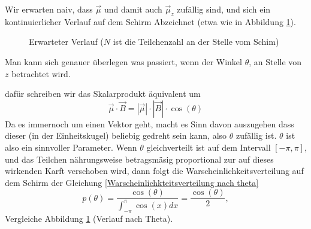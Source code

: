 \documentclass{article}
\begin{document}
Wir erwarten naiv, dass $\vec{\mu}$ und damit auch $\vec{\mu}_z$ zufällig sind, und sich ein kontinuierlicher Verlauf auf dem Schirm Abzeichnet (etwa wie in Abbildung \ref{verlauf warscheinlichkeit naiv}).

\begin{figure}[h]
\centering
\begin{subfigure}
\end{subfigure}
\begin{subfigure}
\end{subfigure}

\caption{Erwarteter Verlauf ($N$ ist die Teilchenzahl an der Stelle vom Schim)}
\label{verlauf warscheinlichkeit naiv}
\end{figure}
\color{gray}
Man kann sich genauer überlegen was passiert, wenn der Winkel $\theta$, an Stelle von $z$ betrachtet wird.
\newline

dafür schreiben wir das Skalarprodukt äquivalent um 
\begin{equation}
 \vec{\mu} \cdot \vec{B} = |\vec{\mu}| \cdot |\vec{B}| \cdot \cos{(\theta)}
\end{equation}
Da es immernoch um einen Vektor geht, macht es Sinn davon auszugehen dass dieser (in der Einheitskugel) beliebig gedreht sein kann, also $\theta$ zufällig ist. $\theta$ ist also ein sinnvoller Parameter. Wenn $\theta$ gleichverteilt ist auf dem Intervall $[-\pi,\pi]$, und das Teilchen nährungsweise betragsmäsig proportional zur auf dieses wirkenden Karft verschoben wird, dann folgt die Warscheinlichkeitsverteilung auf dem Schirm der Gleichung \eqref{Warscheinlichkteitsverteilung nach theta}
\begin{equation}
p(\theta) = \frac{\cos{(\theta)}}{\int_{-\pi}^{\pi} \cos{(x)}dx} = \frac{\cos{(\theta)}}{2},
\label{Warscheinlichkteitsverteilung nach theta}
\end{equation}
Vergleiche Abbildung \ref{verlauf warscheinlichkeit naiv} (Verlauf nach Theta).
\newline
\end{document}
